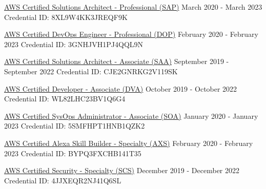 \documentclass[letterpaper]{awesome-cv}
\begin{document}
\begin{cventries}
  \cventry
    {
      \href{https://www.certmetrics.com/amazon/public/badge.aspx?i=4\&t=c\&d=2020-03-14\&ci=AWS00457357}{AWS Certified Solutions Architect - Professional (SAP)}
    }
    {March 2020 - March 2023}
    {Credential ID: 8XL9W4KK3JREQF9K}
    {}
    {}

  \cventry
    {
      \href{https://www.certmetrics.com/amazon/public/badge.aspx?i=5\&t=c\&d=2020-02-04\&ci=AWS00457357}{AWS Certified DevOps Engineer - Professional (DOP)}
    }
    {February 2020 - February 2023}
    {Credential ID: 3GNHJVH1PJ4QQL9N}
    {}
    {}

  \cventry
    {
      \href{https://www.certmetrics.com/amazon/public/badge.aspx?i=1\&t=c\&d=2019-09-12\&ci=AWS00457357}{AWS Certified Solutions Architect - Associate (SAA)}
    }
    {September 2019 - September 2022}
    {Credential ID: CJE2GNRKG2V119SK}
    {}
    {}

  \cventry
    {
      \href{https://www.certmetrics.com/amazon/public/badge.aspx?i=2\&t=c\&d=2019-10-09\&ci=AWS00457357}{AWS Certified Developer - Associate (DVA)}
    }
    {October 2019 - October 2022}
    {Credential ID: WL82LHC23BV1Q6G4}
    {}
    {}

  \cventry
    {
      \href{https://www.certmetrics.com/amazon/public/badge.aspx?i=3&t=c&d=2020-01-04&ci=AWS00457357}{AWS Certified SysOps Administrator - Associate (SOA)}
    }
    {January 2020 - January 2023}
    {Credential ID: 5SMFHPT1HNB1QZK2}
    {}
    {}

  \cventry
    {
      \href{https://www.certmetrics.com/amazon/public/badge.aspx?i=11&t=c&d=2020-02-19&ci=AWS00457357}{AWS Certified Alexa Skill Builder - Specialty (AXS)}
    }
    {February 2020 - February 2023}
    {Credential ID: BYPQ3FXCHB141T35}
    {}
    {}

  \cventry
    {
      \href{https://www.certmetrics.com/amazon/public/badge.aspx?i=7&t=c&d=2019-12-18&ci=AWS00457357}{AWS Certified Security - Specialty (SCS)}
    }
    {December 2019 - December 2022}
    {Credential ID: 4JJXEQR2NJ41Q6SL}
    {}
    {}

\end{cventries}
\end{document}
